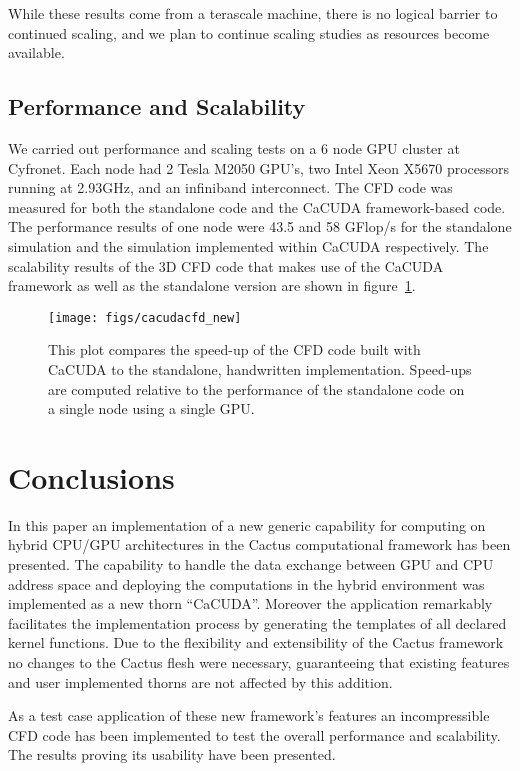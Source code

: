 \documentclass{IOS-Book-Article}
\begin{document}
While these results come from a terascale machine, there is no logical barrier to continued scaling,
and we plan to continue scaling studies as resources become available.

\subsection{Performance and Scalability}
We carried out performance and scaling tests on a 6 node GPU cluster at Cyfronet.
Each node had 2 Tesla M2050 GPU's,
two Intel Xeon X5670 processors running at 2.93GHz,
and an infiniband interconnect.
The CFD code was measured for both the standalone code and the CaCUDA
framework-based code. The performance results of one node were 43.5 and 58 GFlop/s for the 
standalone simulation and the simulation implemented within CaCUDA respectively. 
The scalability results of the 3D CFD code that makes use of the CaCUDA framework as
well as the standalone version are shown in figure~\ref{fig:cacudacfdbench}.
\begin{figure}[htp]
  \centering
  \texttt{[image: figs/cacudacfd\_new]}
  \caption{This plot compares the speed-up of the CFD code built with CaCUDA to 
  the standalone, handwritten implementation.
  Speed-ups are computed relative to the performance of the standalone code
  on a single node using a single GPU.}
  \label{fig:cacudacfdbench}
\end{figure}

\section{Conclusions}
In this paper an implementation of a new generic capability for computing on hybrid CPU/GPU architectures
in the Cactus computational framework has been presented. The capability to handle the data exchange
between GPU and CPU address space and deploying the computations in the hybrid environment was
implemented as a new thorn ``CaCUDA''. Moreover the application remarkably facilitates the implementation 
process by generating the templates of all declared kernel functions.  Due to the flexibility and 
extensibility of the Cactus framework no changes to the Cactus flesh were necessary, guaranteeing 
that existing features and user implemented thorns are not affected by this addition. 

As a test case application of these new framework's features an incompressible CFD code has been 
implemented to test the overall performance and scalability. The results proving its usability 
have been presented. 
\end{document}
